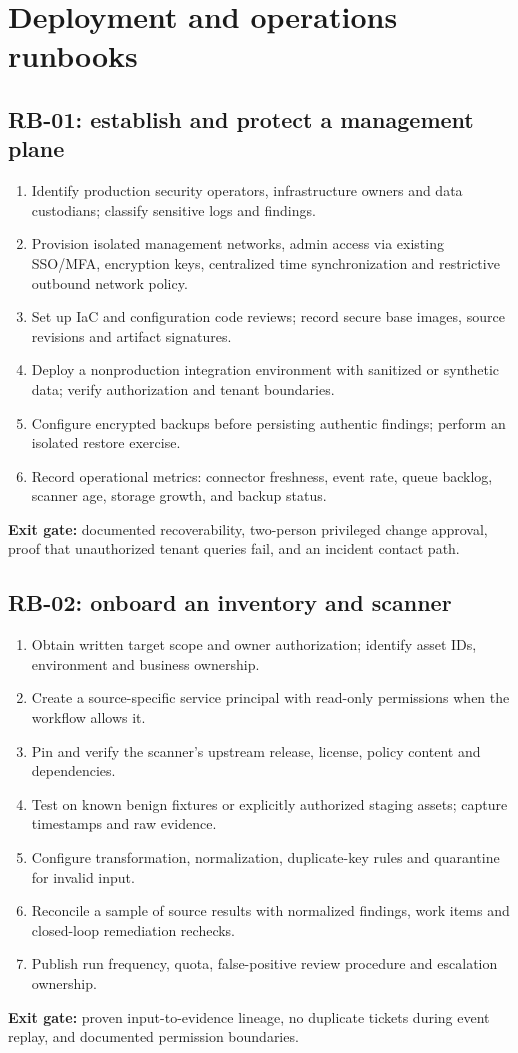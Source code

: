 \documentclass[11pt,oneside]{report}
\begin{document}
\chapter{Deployment and operations runbooks}
\section{RB-01: establish and protect a management plane}
\begin{enumerate}[leftmargin=1.6em]
\item Identify production security operators, infrastructure owners and data custodians; classify sensitive logs and findings.
\item Provision isolated management networks, admin access via existing SSO/MFA, encryption keys, centralized time synchronization and restrictive outbound network policy.
\item Set up IaC and configuration code reviews; record secure base images, source revisions and artifact signatures.
\item Deploy a nonproduction integration environment with sanitized or synthetic data; verify authorization and tenant boundaries.
\item Configure encrypted backups before persisting authentic findings; perform an isolated restore exercise.
\item Record operational metrics: connector freshness, event rate, queue backlog, scanner age, storage growth, and backup status.
\end{enumerate}
\textbf{Exit gate:} documented recoverability, two-person privileged change approval, proof that unauthorized tenant queries fail, and an incident contact path.

\section{RB-02: onboard an inventory and scanner}
\begin{enumerate}[leftmargin=1.6em]
\item Obtain written target scope and owner authorization; identify asset IDs, environment and business ownership.
\item Create a source-specific service principal with read-only permissions when the workflow allows it.
\item Pin and verify the scanner's upstream release, license, policy content and dependencies.
\item Test on known benign fixtures or explicitly authorized staging assets; capture timestamps and raw evidence.
\item Configure transformation, normalization, duplicate-key rules and quarantine for invalid input.
\item Reconcile a sample of source results with normalized findings, work items and closed-loop remediation rechecks.
\item Publish run frequency, quota, false-positive review procedure and escalation ownership.
\end{enumerate}
\textbf{Exit gate:} proven input-to-evidence lineage, no duplicate tickets during event replay, and documented permission boundaries.
\end{document}
